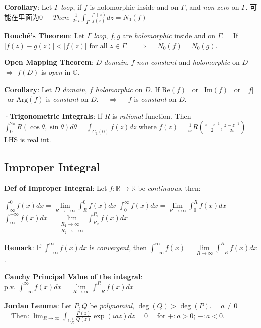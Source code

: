\documentclass[9pt]{article}
\begin{document}
\quad \textbf{Corollary}: {\small Let $\Gamma$ \textit{loop}, if $f$ is holomorphic inside and on $\Gamma$, and \textit{non-zero} on $\Gamma$. {\tiny 可能在里面为0} \ \ \textit{Then}: $\frac{1}{2\pi i}\int_{\Gamma}\frac{f'(z)}{f(z)}dz=N_0(f)$}

\textbf{Rouché's Theorem}: Let $\Gamma$ \textit{loop}, $f,g$ are \textit{holomorphic} inside and on $\Gamma$. \ \ If $|f(z)-g(z)|<|f(z)|$ for all $z\in\Gamma$. \ \ $\Rightarrow$ \ \ $N_0(f) = N_0(g)$.

\textbf{Open Mapping Theorem}: $D$ \textit{domain}, $f$ \textit{non-constant} and \textit{holomorphic} on $D$ $\Rightarrow$ $f(D)$ is \textit{open} in $\mathbb{C}$.

\quad \textbf{Corollary}: Let $D$ \textit{domain}, $f$ \textit{holomorphic} on $D$. \quad If $\text{Re}(f)$ \ or \ $\text{Im}(f)$ \ or \ $|f|$ \ or $\text{Arg}(f)$ is \textit{constant} on $D$. \ \ $\Rightarrow$ \ \ $f$ is \textit{constant} on $D$.

·\textbf{Trigonometric Integrals}: {\small If $R$ is \textit{rational} function. Then $\int_0^{2\pi}R(\cos\theta,\sin\theta)d\theta = \int_{C_1(0)}f(z)dz$ \quad where $f(z)=\frac{1}{iz}R\left(\frac{z+z^{-1}}{2},\frac{z-z^{-1}}{2i}\right)$} {\tiny LHS is real int.}


\subsection{Improper Integral} %

\textbf{Def of Improper Integral}: Let $f:\mathbb{R}\to\mathbb{R}$ be \textit{continuous}, then:

\qquad $\int_{\infty}^0 f(x)dx =\lim\limits_{R\to-\infty}\int_{R}^0 f(x)dx$ \quad $\int_{0}^{\infty}f(x)dx=\lim\limits_{R\to\infty}\int_0^R f(x)dx$ \quad $\int_{\infty}^{-\infty}f(x)dx=\lim\limits_{\substack{R_1\to\infty\\R_2\to-\infty}}\int_{R_2}^{R_1}f(x)dx$ 

\vspace{-6pt}
\quad \textbf{Remark}: If $\int_{-\infty}^{\infty}f(x)dx$ is \textit{convergent}, then $\int_{-\infty}^{\infty} f(x)=\lim\limits_{R\to\infty}\int_{-R}^{R}f(x)dx$.

\quad \textbf{Cauchy Principal Value of the integral}: $\text{p.v. }\int_{-\infty}^{\infty}f(x)dx=\lim\limits_{R\to\infty}\int_{-R}^{R}f(x)dx$

\textbf{Jordan Lemma}: {\small Let $P,Q$ be \textit{polynomial}, $\deg(Q)>\deg(P)$. \ \ $a\ne 0$} \ \ Then: $\lim_{R\to\infty}\int_{C_R^{\pm}} \frac{P(z)}{Q(z)}\exp(iaz)dz=0$ \ \ for $+:a>0$; $-:a<0$.
\end{document}
